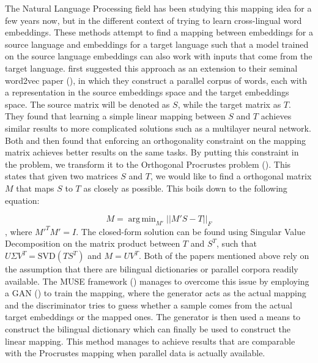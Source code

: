 \documentclass[12pt]{extreport}
\DeclareMathOperator*{\argmin}{arg\,min}
\begin{document}
The Natural Language Processing field has been studying this mapping idea for a few years now, but in the different context of trying to learn cross-lingual word embeddings. These methods attempt to find a mapping between embeddings for a source language and embeddings for a target language such that a model trained on the source language embeddings can also work with inputs that come from the target language. \cite{mikolov2013distributed} first suggested this approach as an extension to their seminal word2vec paper (\cite{word2vec}), in which they construct a parallel corpus of words, each with a representation in the source embeddings space and the target embeddings space. The source matrix will be denoted as $S$, while the target matrix as $T$. They found that learning a simple linear mapping between $S$ and $T$ achieves similar results to more complicated solutions such as a multilayer neural network. Both \cite{normalized-word-embbedings} and \cite{principle-bilingual-mappings} then found that enforcing an orthogonality constraint on the mapping matrix achieves better results on the same tasks. By putting this constraint in the problem, we transform it to the Orthogonal Procrustes problem (\cite{procrustes}). This states that given two matrices $S$ and $T$, we would like to find a orthogonal matrix $M$ that maps $S$ to $T$ as closely as possible. This boils down to the following equation:

\begin{equation}
    M = \argmin_{M'} ||M' S - T ||_F
\end{equation}
, where $M'^T M' = I$. The closed-form solution can be found using Singular Value Decomposition on the matrix product between $T$ and $S^T$, such that $U\Sigma V^T = \text{SVD}(TS^T)$ and $M = UV^T$. Both of the papers mentioned above rely on the assumption that there are bilingual dictionaries or parallel corpora readily available. The MUSE framework (\cite{muse}) manages to overcome this issue by employing a GAN (\cite{gan}) to train the mapping, where the generator acts as the actual mapping and the discriminator tries to guess whether a sample comes from the actual target embeddings or the mapped ones. The generator is then used a means to construct the bilingual dictionary which can finally be used to construct the linear mapping. This method manages to achieve results that are comparable with the Procrustes mapping when parallel data is actually available.
\end{document}
